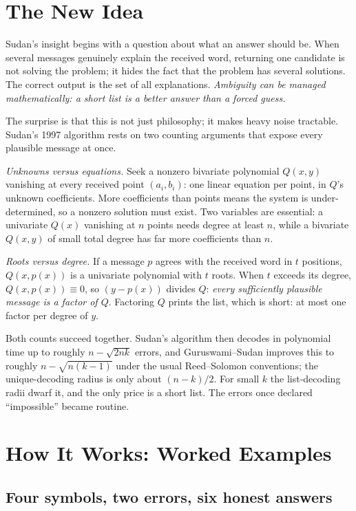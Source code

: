 \section{The New Idea}

Sudan's insight begins with a question about what an answer should be. When several messages genuinely explain the received word, returning one candidate is not solving the problem; it hides the fact that the problem has several solutions. The correct output is the set of all explanations. \emph{Ambiguity can be managed mathematically: a short list is a better answer than a forced guess.}

The surprise is that this is not just philosophy; it makes heavy noise tractable. Sudan's 1997 algorithm rests on two counting arguments that expose every plausible message at once.

\emph{Unknowns versus equations.} Seek a nonzero bivariate polynomial $Q(x,y)$ vanishing at every received point $(a_i,b_i)$: one linear equation per point, in $Q$'s unknown coefficients. More coefficients than points means the system is under-determined, so a nonzero solution must exist. Two variables are essential: a univariate $Q(x)$ vanishing at $n$ points needs degree at least $n$, while a bivariate $Q(x,y)$ of small total degree has far more coefficients than $n$.

\emph{Roots versus degree.} If a message $p$ agrees with the received word in $t$ positions, $Q(x,p(x))$ is a univariate polynomial with $t$ roots. When $t$ exceeds its degree, $Q(x,p(x))\equiv0$, so $(y-p(x))$ divides $Q$: \emph{every sufficiently plausible message is a factor of $Q$}. Factoring $Q$ prints the list, which is short: at most one factor per degree of $y$.

Both counts succeed together. Sudan's algorithm then decodes in polynomial time up to roughly $n-\sqrt{2nk}$ errors, and Guruswami--Sudan improves this to roughly $n-\sqrt{n(k-1)}$ under the usual Reed--Solomon conventions; the unique-decoding radius is only about $(n-k)/2$. For small $k$ the list-decoding radii dwarf it, and the only price is a short list. The errors once declared ``impossible'' became routine.

\section{How It Works: Worked Examples}

\subsection{Four symbols, two errors, six honest answers}

